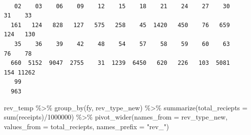 \documentclass[
  letterpaper,
  DIV=11,
  numbers=noendperiod]{scrreport}
\newenvironment{Shaded}{\begin{snugshade}}{\end{snugshade}}
\newcommand{\AttributeTok}[1]{\textcolor[rgb]{0.40,0.45,0.13}{#1}}
\newcommand{\CommentTok}[1]{\textcolor[rgb]{0.37,0.37,0.37}{#1}}
\newcommand{\DecValTok}[1]{\textcolor[rgb]{0.68,0.00,0.00}{#1}}
\newcommand{\FunctionTok}[1]{\textcolor[rgb]{0.28,0.35,0.67}{#1}}
\newcommand{\NormalTok}[1]{\textcolor[rgb]{0.00,0.23,0.31}{#1}}
\newcommand{\OtherTok}[1]{\textcolor[rgb]{0.00,0.23,0.31}{#1}}
\newcommand{\SpecialCharTok}[1]{\textcolor[rgb]{0.37,0.37,0.37}{#1}}
\newcommand{\StringTok}[1]{\textcolor[rgb]{0.13,0.47,0.30}{#1}}
\begin{document}
\begin{Shaded}
\end{Shaded}

\begin{verbatim}

   02    03    06    09    12    15    18    21    24    27    30    31    33 
  161   124   828   127   575   258    45  1420   450    76   659   124   130 
   35    36    39    42    48    54    57    58    59    60    63    76    78 
  660  5152  9047  2755    31  1239  6450   620   226   103  5081   154 11262 
   99 
  963 
\end{verbatim}

\begin{Shaded}
\begin{Highlighting}[]
\NormalTok{rev\_temp }\SpecialCharTok{\%\textgreater{}\%} 
  \FunctionTok{group\_by}\NormalTok{(fy, rev\_type\_new) }\SpecialCharTok{\%\textgreater{}\%} 
  \FunctionTok{summarize}\NormalTok{(}\AttributeTok{total\_reciepts =} \FunctionTok{sum}\NormalTok{(receipts)}\SpecialCharTok{/}\DecValTok{1000000}\NormalTok{) }\SpecialCharTok{\%\textgreater{}\%}
  \FunctionTok{pivot\_wider}\NormalTok{(}\AttributeTok{names\_from =}\NormalTok{ rev\_type\_new, }\AttributeTok{values\_from =}\NormalTok{ total\_reciepts, }\AttributeTok{names\_prefix =} \StringTok{"rev\_"}\NormalTok{) }
\end{Highlighting}
\end{Shaded}
\end{document}
